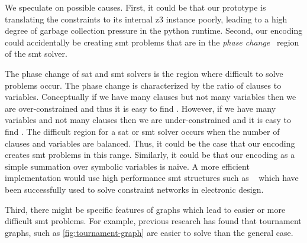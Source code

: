 We speculate on possible causes. First, it could be that our prototype is
translating the constraints to its internal z3 instance poorly, leading to a
high degree of garbage collection pressure in the python runtime. Second, our
encoding could accidentally be creating \ac{smt} problems that are in the
\emph{phase change}~\cite{Gent94thesat} region of the \ac{smt} solver.

The phase change of \ac{sat} and \ac{smt} solvers is the region where difficult
to solve problems occur. The phase change is characterized by the ratio of
clauses to variables. Conceptually if we have many clauses but not many
variables then we are over-constrained and thus it is easy to find .
However, if we have many variables and not many clauses then we are
under-constrained and it is easy to find . The difficult region for a
\ac{sat} or \ac{smt} solver occurs when the number of clauses and variables are
balanced. Thus, it could be the case that our encoding creates \ac{smt} problems
in this range. Similarly, it could be that our encoding as a simple summation
over symbolic variables is naive. A more efficient implementation would use high
performance \ac{smt} structures such as ~\cite{BarFT-SMTLIB}
which have been successfully used to solve constraint networks in electronic
design\cite{10.5555/1550723}.


Third, there might be specific features of graphs which lead to
easier or more difficult \ac{smt} problems. For example, previous research has
found that tournament graphs, such as \autoref{fig:tournament-graph} are easier
to solve than the general case.


